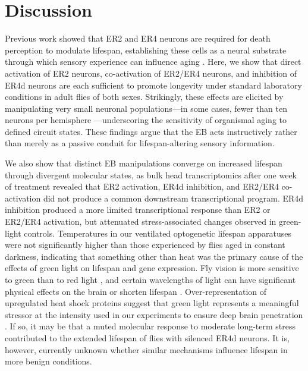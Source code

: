 \section{Discussion}

Previous work showed that ER2 and ER4 neurons are required for death perception to modulate lifespan, establishing these cells as a neural substrate through which sensory experience can influence aging \citep{gendron2023}. 
Here, we show that direct activation of ER2 neurons, co-activation of ER2/ER4 neurons, and inhibition of ER4d neurons are each sufficient to promote longevity under standard laboratory conditions in adult flies of both sexes. 
Strikingly, these effects are elicited by manipulating very small neuronal populations---in some cases, fewer than ten neurons per hemisphere \citep{omoto2018}---underscoring the sensitivity of organismal aging to defined circuit states. 
These findings argue that the EB acts instructively rather than merely as a passive conduit for lifespan-altering sensory information.

We also show that distinct EB manipulations converge on increased lifespan through divergent molecular states, as bulk head transcriptomics after one week of treatment revealed that ER2 activation, ER4d inhibition, and ER2/ER4 co-activation did not produce a common downstream transcriptional program. 
ER4d inhibition produced a more limited transcriptional response than ER2 or ER2/ER4 activation, but attenuated stress-associated changes observed in green-light controls. 
Temperatures in our ventilated optogenetic lifespan apparatuses were not significantly higher than those experienced by flies aged in constant darkness, indicating that something other than heat was the primary cause of the effects of green light on lifespan and gene expression. 
Fly vision is more sensitive to green than to red light \citep{salcedo1999}, and certain wavelengths of light can have significant physical effects on the brain \citep{song2022} or shorten lifespan \citep{johnson2023}. Over-representation of upregulated heat shock proteins suggest that green light represents a meaningful stressor at the intensity used in our experiments to ensure deep brain penetration \citep{wolff2015}. 
If so, it may be that a muted molecular response to moderate long-term stress contributed to the extended lifespan of flies with silenced ER4d neurons. 
It is, however, currently unknown whether similar mechanisms influence lifespan in more benign conditions. 

